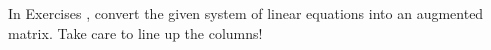 {In Exercises}
{, convert the given system of linear equations into an augmented matrix. Take care to line up the columns!}
